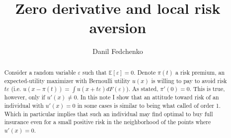 \documentclass[a4paper]{article}
\title{Zero derivative and local risk aversion}
\date{}
\author{Danil Fedchenko}
\newcommand{\expect}{\mathbb{E}}
\begin{document}
	\maketitle
	\begin{abstract}
	Consider a random variable $\varepsilon$ such that $\expect[\varepsilon] = 0$. Denote $\pi(t)$ a risk premium, an expected-utility maximizer with Bernoulli utility $u(x)$ is willing to pay to avoid risk $t \varepsilon$ (i.e. $u(x-\pi(t)) = \int u(x+t\varepsilon)dF(\varepsilon)$). As \cite{segal1990first} stated, $\pi'(0) = 0$. This is true, however, only if $u'(x) \neq 0$. In this note I show that an attitude toward risk of an individual with $u'(x) = 0$ in some cases is similar to being what \cite{segal1990first} called of order 1. Which in particular implies that such an individual may find optimal to buy full insurance even for a small positive risk in the neighborhood of the points where $u'(x) = 0$.
	\end{abstract}
	\newpage
\end{document}
